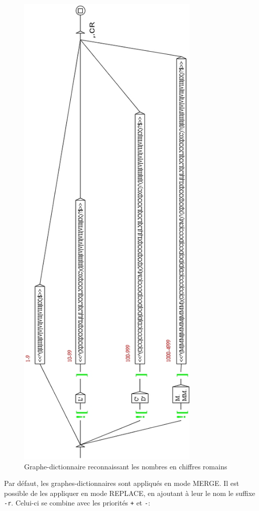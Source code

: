 \begin{figure}[!p]
\begin{center}
\includegraphics[height=24cm]{resources/img/fig3-14.png}
\caption{Graphe-dictionnaire reconnaissant les nombres en chiffres romains\label{graph-CR}}
\end{center}
\end{figure}

\bigskip
\noindent Par défaut, les graphes-dictionnaires sont appliqués en mode MERGE. Il est possible 
de les appliquer en mode REPLACE, en ajoutant à leur le nom le suffixe \verb+-r+. Celui-ci se
combine avec les priorités \verb-+- et \verb+-+:

